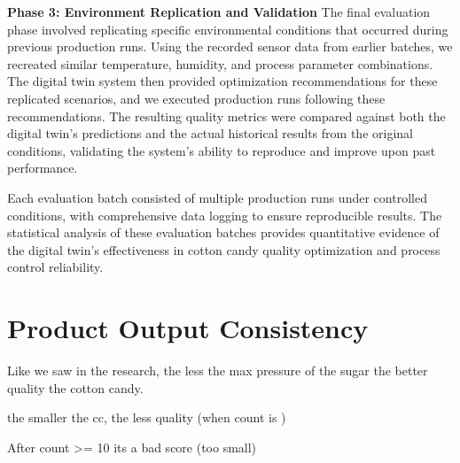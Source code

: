 \textbf{Phase 3: Environment Replication and Validation}
The final evaluation phase involved replicating specific environmental conditions that occurred during previous production runs. Using the recorded sensor data from earlier batches, we recreated similar temperature, humidity, and process parameter combinations. The digital twin system then provided optimization recommendations for these replicated scenarios, and we executed production runs following these recommendations. The resulting quality metrics were compared against both the digital twin's predictions and the actual historical results from the original conditions, validating the system's ability to reproduce and improve upon past performance.

Each evaluation batch consisted of multiple production runs under controlled conditions, with comprehensive data logging to ensure reproducible results. The statistical analysis of these evaluation batches provides quantitative evidence of the digital twin's effectiveness in cotton candy quality optimization and process control reliability.

\section{Product Output Consistency}
Like we saw in the research, the less the max pressure of the sugar the better quality the cotton candy.

the smaller the cc, the less quality (when count is )

After count >= 10 its a bad score (too small)